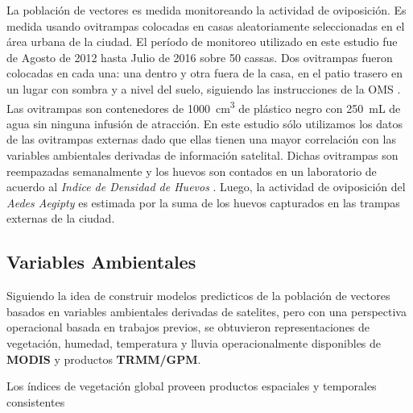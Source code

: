   \par La población de vectores es medida monitoreando la actividad de oviposición.
    Es medida usando ovitrampas colocadas en casas aleatoriamente seleccionadas
    en el área urbana de la ciudad. El período de monitoreo utilizado en este
    estudio fue de Agosto de 2012 hasta Julio de 2016 sobre 50 cassas. Dos
    ovitrampas fueron colocadas en cada una: una dentro y otra fuera de la casa,
    en el patio trasero en un lugar con sombra y a nivel del suelo, siguiendo
    las instrucciones de la OMS \cite{peridomestic}. Las ovitrampas son contenedores
    de \SI{1000}{\centi\meter\cubed} de plástico negro con \SI{250}{\milli\liter}
    de agua sin ninguna infusión de atracción.
    En este estudio sólo utilizamos los datos de las ovitrampas externas dado
    que ellas tienen una mayor correlación con las variables ambientales
    derivadas de información satelital. Dichas ovitrampas son reempazadas
    semanalmente y los huevos son contados en un laboratorio de acuerdo al
    \textit{Indice de Densidad de Huevos} \cite{indice_huevos}. Luego, la
    actividad de oviposición del \textit{Aedes Aegipty} es estimada por la suma
    de los huevos capturados en las trampas externas de la ciudad.



\subsection{Variables Ambientales}

  \par Siguiendo la idea de construir modelos predicticos de la población de
    vectores basados en variables ambientales derivadas de satelites, pero con una
    perspectiva operacional basada en trabajos previos, se obtuvieron representaciones
    de vegetación, humedad, temperatura y lluvia operacionalmente disponibles
    de \textbf{MODIS} y productos \textbf{TRMM/GPM}.

  \par Los índices de vegetación global proveen productos espaciales y
    temporales consistentes




